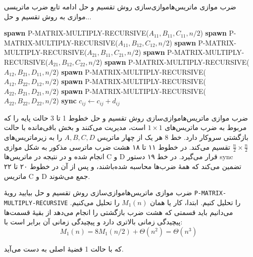 \begin{itemframe-s}{ضرب موازی ماتریس‌ها}{موازی‌سازی روش تقسیم و حل}
\itm
ادامه تابع ضرب ماتریسی موازی به روش تقسیم و حل...
 \begin{algorithm}[H]\alglr
\begin{algorithmic}[1]
\setcounter{ALG@line}{10}
\State \textbf{spawn} P-MATRIX-MULTIPLY-RECURSIVE($A_{11}, B_{11}, C_{11}, n/2$)
\State \textbf{spawn} P-MATRIX-MULTIPLY-RECURSIVE($A_{11}, B_{12}, C_{12}, n/2$)
\State \textbf{spawn} P-MATRIX-MULTIPLY-RECURSIVE($A_{21}, B_{11}, C_{21}, n/2$)
\State \textbf{spawn} P-MATRIX-MULTIPLY-RECURSIVE($A_{21}, B_{12}, C_{22}, n/2$)
\State \textbf{spawn} P-MATRIX-MULTIPLY-RECURSIVE($A_{12}, B_{21}, D_{11}, n/2$)
\State \textbf{spawn} P-MATRIX-MULTIPLY-RECURSIVE($A_{12}, B_{22}, D_{12}, n/2$)
\State \textbf{spawn} P-MATRIX-MULTIPLY-RECURSIVE($A_{22}, B_{21}, D_{21}, n/2$)
\State \textbf{spawn} P-MATRIX-MULTIPLY-RECURSIVE($A_{22}, B_{22}, D_{22}, n/2$)
\State \textbf{sync} 
 
        \State $c_{ij} \gets c_{ij} + d_{ij}$
    \EndFor
\EndFor
\end{algorithmic}
\end{algorithm}
\end{itemframe-s}


\begin{itemframe-s}{ضرب موازی ماتریس‌ها}{موازی‌سازی روش تقسیم و حل}
\itm
خطوط 1 تا 3 حالت پایه را که مربوط به ضرب ماتریس‌های
$1 \times 1$
است، مدیریت می‌کنند و بخش باقی‌مانده با حالت بازگشتی سروکار دارد. خط 8 هر یک از چهار ماتریس
$A, B, C, D$
را به زیرماتریس‌های
$
\frac{n}{2} \times \frac{n}{2}
$
تقسیم می‌کند.
\itm
در خطوط ۱۱ تا ۱۸ هشت ضرب ماترسی مذکور به شکل موازی انجام شده و در نتیجه در ماتریس‌ها C‌ و D قرار می‌گیرد.
\itm
در خط ۱۹ دستور sync تضمین می‌کند که همهٔ ضرب‌ها محاسبه شده‌باشند، و پس از آن در خطوط ۲۰ تا ۲۲ ماتریس C و D جمع می‌شوند.
\end{itemframe-s}


\begin{itemframe-s}{ضرب موازی ماتریس‌ها}{موازی‌سازی روش تقسیم و حل}
\itm
بیایید رویهٔ
\texttt{P-MATRIX-MULTIPLY-RECURSIVE}
را تحلیل کنیم. ابتدا، کار یا همان
$M_1(n)$
را تحلیل می‌کنیم.
\itm
می‌دانیم باید قسمتی که هشت ضرب بازگشتی
را انجام می‌دهد از بقیهٔ قسمت‌ها پیچیدگی زمانی بالاتری دارد و پیچیدگی زمانی ‌آن برابر است با:
$$
M_1(n) = 8M_1(n/2) + \Theta(n^2) = \Theta(n^3)
$$

که با حالت 1 قضیهٔ اصلی
به دست می‌آید.
\end{itemframe-s}


